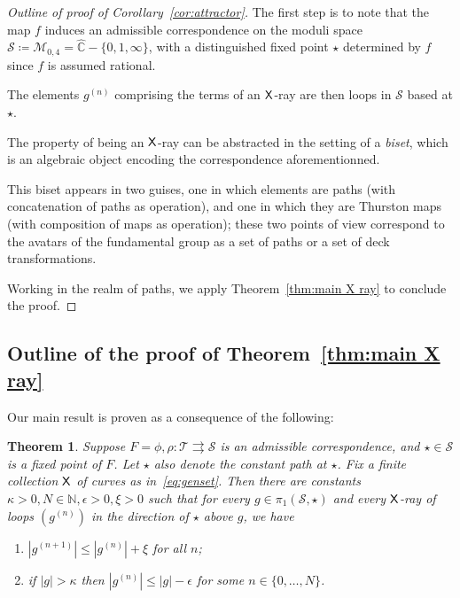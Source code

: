 \documentclass{amsart}
\newcommand\C{{\mathbb{C}}}
\newcommand\N{{\mathbb{N}}}
\newcommand{\rs}{\widehat{\C}}
\newtheorem{mainthm}{Theorem}\renewcommand\themainthm{\Alph{mainthm}}
\theoremstyle{definition}
\theoremstyle{remark}
\newcommand{\sfX}{{\sf X}}
\newcommand{\cT}{\mathcal{T}}
\newcommand{\cS}{\mathcal{S}}
\begin{document}
\begin{proof}[Outline of proof of Corollary~\ref{cor:attractor}]
  The first step is to note that the map $f$ induces an admissible correspondence on the moduli space $\cS\coloneqq\mathscr M_{0,4}=\rs - \{0,1,\infty\}$, with a distinguished fixed point $\star$ determined by $f$ since $f$ is assumed rational.

  The elements $g^{(n)}$ comprising the terms of an $\sfX$-ray are then loops in $\cS$ based at $\star$.  

  The property of being an $\sfX$-ray can be abstracted in the setting of a \emph{biset}, which is an algebraic object encoding the correspondence aforementionned.

  This biset appears in two guises, one in which elements are paths (with concatenation of paths as operation), and one in which they are Thurston maps (with composition of maps as operation); these two points of view correspond to the avatars of the fundamental group as a set of paths or a set of deck transformations.

  Working in the realm of paths, we apply Theorem~\ref{thm:main X ray} to conclude the proof.
\end{proof}


\subsection{Outline of the proof of Theorem~\ref{thm:main X ray}}\label{ss:outline}
Our main result is proven as a consequence of the following:
\begin{mainthm}\label{thm:main}
  Suppose $F=\phi, \rho\colon \cT \rightrightarrows\cS$ is an admissible correspondence, and $\star\in \cS$ is a fixed point of $F$.  Let $\star$ also denote the constant path at $\star$.  Fix a finite collection $\sfX$ of curves as in~\eqref{eq:genset}. Then there are constants $\kappa>0,N\in\N,\epsilon>0,\xi>0$ such that for every $g\in \pi_1(\cS, \star)$ and every $\sfX$-ray of loops $(g^{(n)})$ in the direction of $\star$ above $g$, we have
  \begin{enumerate}
  \item $|g^{(n+1)}|\le|g^{(n)}|+\xi$ for all $n$;
   \item if $|g|>\kappa$ then $|g^{(n)}|\le |g|-\epsilon$ for some $n\in\{0,\dots,N\}$.
  \end{enumerate}
\end{mainthm}
\end{document}
